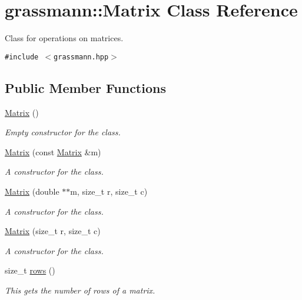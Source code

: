 \hypertarget{classgrassmann_1_1Matrix}{
\section{grassmann::Matrix Class Reference}
\label{classgrassmann_1_1Matrix}
}
Class for operations on matrices.  


{\tt \#include $<$grassmann.hpp$>$}

\subsection*{Public Member Functions}
\begin{CompactItemize}
\item 
\hyperlink{classgrassmann_1_1Matrix_2e9b599f051c90d4b8ad839bf6ad6640}{Matrix} ()
\begin{CompactList}\small\item\em Empty constructor for the class. \item\end{CompactList}\item 
\hyperlink{classgrassmann_1_1Matrix_cc0d1ad46f484440f5a9bf96f8d8c9b7}{Matrix} (const \hyperlink{classgrassmann_1_1Matrix}{Matrix} \&m)
\begin{CompactList}\small\item\em A constructor for the class. \item\end{CompactList}\item 
\hyperlink{classgrassmann_1_1Matrix_c902b727501ab805b383514480fc9ee6}{Matrix} (double $\ast$$\ast$m, size\_\-t r, size\_\-t c)
\begin{CompactList}\small\item\em A constructor for the class. \item\end{CompactList}\item 
\hyperlink{classgrassmann_1_1Matrix_1dfe3208dad7f6bde0744b6b2a7146a5}{Matrix} (size\_\-t r, size\_\-t c)
\begin{CompactList}\small\item\em A constructor for the class. \item\end{CompactList}\item 
size\_\-t \hyperlink{classgrassmann_1_1Matrix_1d0d6d6e85cce10485ede7b5780b92de}{rows} ()
\begin{CompactList}\small\item\em This gets the number of rows of a matrix. \item\end{CompactList}\item 
$$
\end{CompactItemize}
